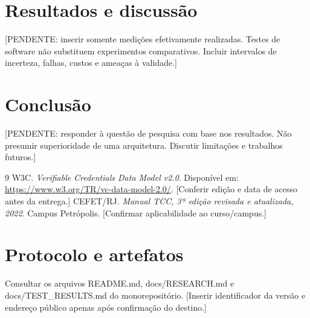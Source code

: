 \documentclass[12pt,a4paper,oneside]{report}
\begin{document}
\chapter{Resultados e discussão}
[PENDENTE: inserir somente medições efetivamente realizadas. Testes de software não substituem experimentos comparativos. Incluir intervalos de incerteza, falhas, custos e ameaças à validade.]
\chapter{Conclusão}
[PENDENTE: responder à questão de pesquisa com base nos resultados. Não presumir superioridade de uma arquitetura. Discutir limitações e trabalhos futuros.]
\begin{thebibliography}{9}
 W3C. \textit{Verifiable Credentials Data Model v2.0}. Disponível em: \url{https://www.w3.org/TR/vc-data-model-2.0/}. [Conferir edição e data de acesso antes da entrega.]
 CEFET/RJ. \textit{Manual TCC, 3ª edição revisada e atualizada, 2022}. Campus Petrópolis. [Confirmar aplicabilidade ao curso/campus.]
\end{thebibliography}
\appendix
\chapter{Protocolo e artefatos}
Consultar os arquivos README.md, docs/RESEARCH.md e docs/TEST\_RESULTS.md do monorepositório. [Inserir identificador da versão e endereço público apenas após confirmação do destino.]
\end{document}
